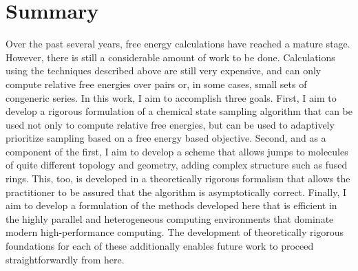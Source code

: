 \section{Summary}
%
Over the past several years, free energy calculations have reached a mature stage.
%
However, there is still a considerable amount of work to be done.
%
Calculations using the techniques described above are still very expensive, and can only compute relative free energies over pairs or, in some cases, small sets of congeneric series.
%
In this work, I aim to accomplish three goals.
%
First, I aim to develop a rigorous formulation of a chemical state sampling algorithm that can be used not only to compute relative free energies, but can be used to adaptively prioritize sampling based on a free energy based objective.
%
Second, and as a component of the first, I aim to develop a scheme that allows jumps to molecules of quite different topology and geometry, adding complex structure such as fused rings.
%
This, too, is developed in a theoretically rigorous formalism that allows the practitioner to be assured that the algorithm is asymptotically correct.
%
Finally, I aim to develop a formulation of the methods developed here that is efficient in the highly parallel and heterogeneous computing environments that dominate modern high-performance computing.
%
The development of theoretically rigorous foundations for each of these additionally enables future work to proceed straightforwardly from here.